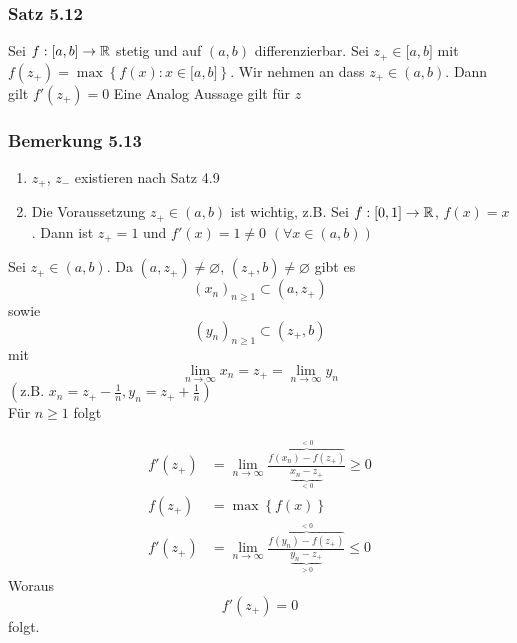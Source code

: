 \subsubsection*{Satz 5.12}
Sei $f:\lbrack a,b\rbrack\to\mathbb{R}$ stetig und auf $\left( a,b\right)$ differenzierbar. Sei $z_+\in\lbrack a,b\rbrack$ mit $f\left( z_+\right) =\max\left\{ f\left( x\right) : x\in\lbrack a,b\rbrack\right\}$. Wir nehmen an dass $z_+\in\left( a,b\right)$. Dann gilt $f'\left( z_+\right) = 0$ Eine Analog Aussage gilt für $z$
\subsubsection*{Bemerkung 5.13}
\begin{enumerate}
\item $z_+$, $z_-$ existieren nach Satz 4.9
\item Die Voraussetzung $z_+\in\left( a,b \right)$ ist wichtig, z.B. Sei $f:\lbrack 0,1\rbrack\to\mathbb{R}$, $f(x)=x$. Dann ist $z_+=1$ und $f'(x)=1\not=0$ $\left( \forall x\in\left( a,b\right)\right)$
\end{enumerate}

\begin{beweis}{}
Sei $z_+\in\left( a,b\right)$. Da $\left( a,z_+\right)\not=\varnothing$, $\left( z_+,b\right)\not=\varnothing$ gibt es 
\[\left( x_n\right)_{n\geq 1}\subset\left( a,z_+\right)\]
sowie
\[\left( y_n\right)_{n\geq 1}\subset\left( z_+,b\right)\]
mit 
\[\mathop {\lim }\limits_{n \to \infty } {x_n} = {z_ + } = \mathop {\lim }\limits_{n \to \infty } {y_n}\]
$\left( \text{z.B. }{x_n} = {z_ + } - \frac{1}{n}, {y_n} = {z_ + } + \frac{1}{n}\right)$\\

Für $n\geq 1$ folgt 

\begin{align*}
f'\left( {{z_ + }} \right) &= \mathop {\lim }\limits_{n \to \infty } \frac{{\overbrace {f\left( {{x_n}} \right) - f\left( {{z_ + }} \right)}^{ < 0}}}{{\underbrace {{x_n} - {z_ + }}_{ < 0}}} \ge 0\\
f\left( {{z_ + }} \right) &= \max \left\{ {f\left( x \right)} \right\}\\
f'\left( {{z_ + }} \right) &= \mathop {\lim }\limits_{n \to \infty } \frac{{\overbrace {f\left( {{y_n}} \right) - f\left( {{z_ + }} \right)}^{ < 0}}}{{\underbrace {{y_n} - {z_ + }}_{ > 0}}} \le 0
\end{align*}
Woraus \[ f'\left( z_+\right) = 0\] folgt.
\end{beweis}

